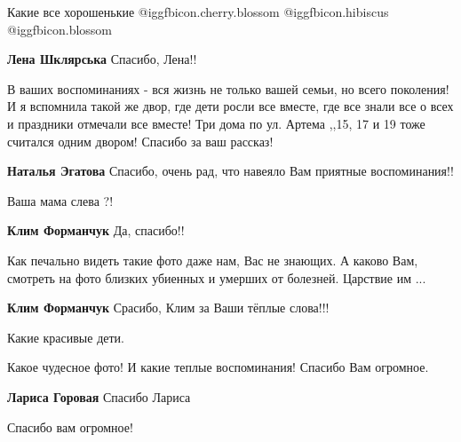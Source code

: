  
 
 
 
 

Какие все хорошенькие  @igg{fbicon.cherry.blossom}  @igg{fbicon.hibiscus}  @igg{fbicon.blossom} 

\textbf{Лена Шклярська} Спасибо, Лена!!


В ваших воспоминаниях - вся жизнь не только вашей семьи, но всего поколения! И
я вспомнила такой же двор, где дети росли все вместе, где все знали все о всех
и праздники отмечали все вместе! Три дома по ул. Артема ,,15, 17 и 19 тоже
считался одним двором! Спасибо за ваш рассказ!

\textbf{Наталья Эгатова} Спасибо, очень рад, что навеяло Вам приятные воспоминания!!

Ваша мама слева ?!

\textbf{Клим Форманчук} Да, спасибо!!


Как печально видеть такие фото даже нам, Вас не знающих. А каково Вам, смотреть
на фото близких убиенных и умерших от болезней. Царствие им ...

\textbf{Клим Форманчук} Срасибо, Клим за Ваши тёплые слова!!!

Какие красивые дети.

Какое чудесное фото! И какие теплые воспоминания! Спасибо Вам огромное.

\textbf{Лариса Горовая} Спасибо Лариса

Спасибо вам огромное!
